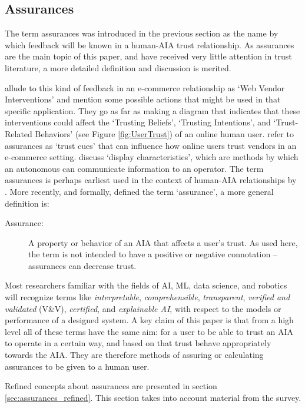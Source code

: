 \subsection{Assurances} \label{sec:assurances}
    The term assurances was introduced in the previous section as the name by which feedback will be known in a human-AIA trust relationship. As assurances are the main topic of this paper, and have received very little attention in trust literature, a more detailed definition and discussion is merited.

    \citet{McKnight2001-fa} allude to this kind of feedback in an e-commerce relationship as `Web Vendor Interventions' and mention some possible actions that might be used in that specific application. They go as far as making a diagram that indicates that these interventions could affect the `Trusting Beliefs', `Trusting Intentions', and `Trust-Related Behaviors' (see Figure \ref{fig:UserTrust}) of an online human user. \citet{Corritore2003-gx} refer to assurances as `trust cues' that can influence how online users trust vendors in an e-commerce setting. \citet{Lee2004-pv} discuss `display characteristics', which are methods by which an autonomous can communicate information to an operator. The term assurances is perhaps earliest used in the context of human-AIA relationships by \citet{Sheridan1984-kx}. More recently, and formally, \citet{Lillard2016-yg} defined the term `assurance', a more general definition is:    
    \begin{description}
        \item [Assurance:] A property or behavior of an AIA that affects a user's trust. As used here, the term is not intended to have a positive or negative connotation -- assurances can decrease trust.
    \end{description}

    Most researchers familiar with the fields of AI, ML, data science, and robotics will recognize terms like \emph{interpretable}, \emph{comprehensible}, \emph{transparent}, \emph{verified and validated} (V\&V), \emph{certified}, and \emph{explainable AI}, with respect to the models or performance of a designed system. A key claim of this paper is that from a high level all of these terms have the same aim: for a user to be able to trust an AIA to operate in a certain way, and based on that trust behave appropriately towards the AIA. They are therefore methods of assuring or calculating assurances to be given to a human user.

    Refined concepts about assurances are presented in section \ref{sec:assurances_refined}. This section takes into account material from the survey.
%


